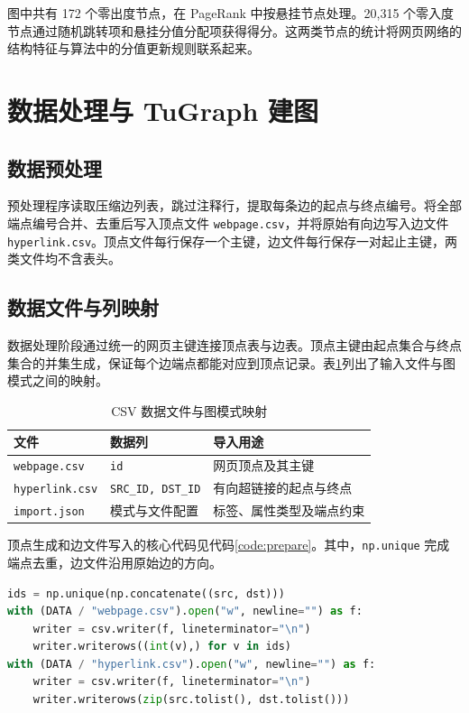 \documentclass[UTF8,a4paper,12pt,fontset=windows]{ctexart}
\begin{document}
图中共有 172 个零出度节点，在 PageRank 中按悬挂节点处理。20,315 个零入度节点通过随机跳转项和悬挂分值分配项获得得分。这两类节点的统计将网页网络的结构特征与算法中的分值更新规则联系起来。

\section{数据处理与 TuGraph 建图}
\subsection{数据预处理}
预处理程序读取压缩边列表，跳过注释行，提取每条边的起点与终点编号。将全部端点编号合并、去重后写入顶点文件 \texttt{webpage.csv}，并将原始有向边写入边文件 \texttt{hyperlink.csv}。顶点文件每行保存一个主键，边文件每行保存一对起止主键，两类文件均不含表头。


\subsection{数据文件与列映射}
数据处理阶段通过统一的网页主键连接顶点表与边表。顶点主键由起点集合与终点集合的并集生成，保证每个边端点都能对应到顶点记录。表\ref{tab:csv}列出了输入文件与图模式之间的映射。
\begin{table}[H]
\centering
\caption{CSV 数据文件与图模式映射}\label{tab:csv}
\begin{tabularx}{\textwidth}{l l X}
\toprule
文件 & 数据列 & 导入用途\\
\midrule
\texttt{webpage.csv} & \texttt{id} & 网页顶点及其主键\\
\texttt{hyperlink.csv} & \texttt{SRC\_ID, DST\_ID} & 有向超链接的起点与终点\\
\texttt{import.json} & 模式与文件配置 & 标签、属性类型及端点约束\\
\bottomrule
\end{tabularx}
\end{table}

顶点生成和边文件写入的核心代码见代码\ref{code:prepare}。其中，\texttt{np.unique} 完成端点去重，边文件沿用原始边的方向。
\par\noindent\begin{minipage}{\linewidth}
\begin{lstlisting}[language=Python,caption={顶点与边文件生成},label={code:prepare}]
ids = np.unique(np.concatenate((src, dst)))
with (DATA / "webpage.csv").open("w", newline="") as f:
    writer = csv.writer(f, lineterminator="\n")
    writer.writerows((int(v),) for v in ids)
with (DATA / "hyperlink.csv").open("w", newline="") as f:
    writer = csv.writer(f, lineterminator="\n")
    writer.writerows(zip(src.tolist(), dst.tolist()))
\end{lstlisting}
\end{minipage}\par
\end{document}
